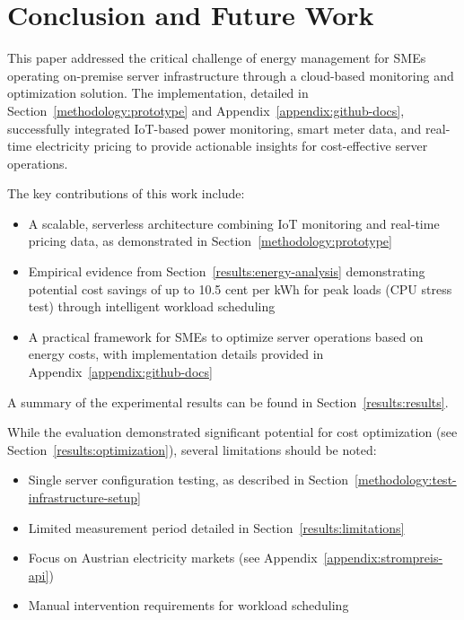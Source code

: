 


\section{Conclusion and Future Work}
\label{conclusion:conclusion}
This paper addressed the critical challenge of energy management for SMEs operating on-premise server infrastructure through a cloud-based monitoring and optimization solution. The implementation, detailed in Section~\ref{methodology:prototype} and Appendix~\ref{appendix:github-docs}, successfully integrated IoT-based power monitoring, smart meter data, and real-time electricity pricing to provide actionable insights for cost-effective server operations.

The key contributions of this work include:
\begin{itemize}
    \item A scalable, serverless architecture combining IoT monitoring and real-time pricing data,
    as demonstrated in Section~\ref{methodology:prototype}
    \item Empirical evidence from Section~\ref{results:energy-analysis} demonstrating 
    potential cost savings of up to 10.5 cent per kWh for peak loads (CPU stress test) through intelligent workload scheduling
    \item A practical framework for SMEs to optimize server operations based on energy costs, with implementation details provided in Appendix~\ref{appendix:github-docs}
\end{itemize}

A summary of the experimental results can be found in Section~\ref{results:results}.

While the evaluation demonstrated significant potential for cost optimization (see Section~\ref{results:optimization}), several limitations should be noted:
\begin{itemize}
    \item Single server configuration testing, as described in Section~\ref{methodology:test-infrastructure-setup}
    \item Limited measurement period detailed in Section~\ref{results:limitations}
    \item Focus on Austrian electricity markets (see Appendix~\ref{appendix:strompreis-api})
    \item Manual intervention requirements for workload scheduling
\end{itemize}

